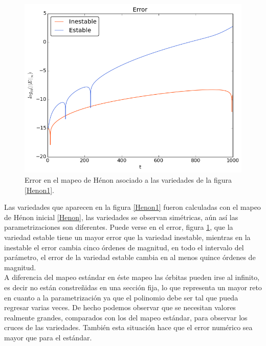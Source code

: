 \begin{figure}[H]
\centering
\includegraphics[scale=0.6]{ErrorHenon1}
\caption{Error en el mapeo de Hénon asociado a las variedades de la figura \ref{Henon1}.}
\label{ErrorHenon1}
\end{figure}
Las variedades que aparecen en la figura \ref{Henon1} fueron calculadas con el mapeo de Hénon inicial \ref{Henon}, las variedades se observan simétricas, aún así las parametrizaciones son diferentes. Puede verse en el error, figura \ref{ErrorHenon1}, que la variedad estable tiene un mayor error que la variedad inestable, mientras en la inestable el error cambia cinco órdenes de magnitud, en todo el intervalo del parámetro, el error de la variedad estable cambia en al menos quince órdenes de magnitud. \\

A diferencia del mapeo estándar en éste mapeo las órbitas pueden irse al infinito, es decir no están  constreñidas en una sección fija, lo que representa un mayor reto en cuanto a la parametrización ya que el polinomio debe ser tal que pueda regresar varias veces. De hecho podemos observar que se necesitan valores realmente grandes, comparados con los del mapeo estándar, para observar los cruces de las variedades. También esta situación hace que el error numérico sea mayor que para el estándar. \\

